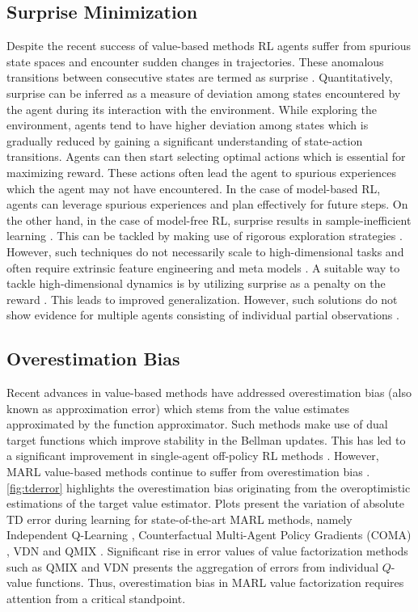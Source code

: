 \documentclass{article}
\begin{document}
\begin{multicols}{2}
\subsection{Surprise Minimization}
Despite the recent success of value-based methods \cite{a3c,rainbow} RL agents suffer from spurious state spaces and encounter sudden changes in trajectories. These anomalous transitions between consecutive states are termed as surprise \cite{surprise}. Quantitatively, surprise can be inferred as a measure of deviation \cite{smirl,gen} among states encountered by the agent during its interaction with the environment. While exploring \cite{curiosity,exploration} the environment, agents tend to have higher deviation among states which is gradually reduced by gaining a significant understanding of state-action transitions. Agents can then start selecting optimal actions which is essential for maximizing reward. These actions often lead the agent to spurious experiences which the agent may not have encountered. In the case of model-based RL, agents can leverage spurious experiences \cite{smirl} and plan effectively for future steps. On the other hand, in the case of model-free RL, surprise results in sample-inefficient learning \cite{surprise}. This can be tackled by making use of rigorous exploration strategies \cite{effectiveexp,statemarginal}. However, such techniques do not necessarily scale to high-dimensional tasks and often require extrinsic feature engineering \cite{hdqn} and meta models \cite{metaexp}. A suitable way to tackle high-dimensional dynamics is by utilizing surprise as a penalty on the reward \cite{gen}. This leads to improved generalization. However, such solutions do not show evidence for multiple agents consisting of individual partial observations \cite{marlsurp}. 

\subsection{Overestimation Bias}
Recent advances \cite{td3} in value-based methods have addressed overestimation bias (also known as approximation error) which stems from the value estimates approximated by the function approximator. Such methods make use of dual target functions \cite{duel} which improve stability in the Bellman updates. This has led to a significant improvement in single-agent off-policy RL methods \cite{sac}. However, MARL value-based methods continue to suffer from overestimation bias \cite{marlover,iqn}. \autoref{fig:tderror} highlights the overestimation bias originating from the overoptimistic estimations of the target value estimator. Plots present the variation of absolute TD error during learning for state-of-the-art MARL methods, namely Independent Q-Learning \cite{iql}, Counterfactual Multi-Agent Policy Gradients (COMA) \cite{coma}, VDN \cite{vdn} and QMIX \cite{qmix}. Significant rise in error values of value factorization methods such as QMIX and VDN presents the aggregation of errors from individual $Q$-value functions. Thus, overestimation bias in MARL value factorization requires attention from a critical standpoint.


\end{multicols}
\end{document}
